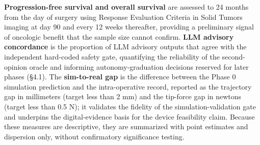 \textbf{Progression-free survival and overall survival} are assessed to 24 months
from the day of surgery using Response Evaluation Criteria in Solid Tumors
imaging at day 90 and every 12 weeks thereafter, providing a preliminary signal of
oncologic benefit that the sample size cannot confirm. \textbf{LLM advisory
concordance} is the proportion of LLM advisory outputs that agree with the
independent hard-coded safety gate, quantifying the reliability of the
second-opinion oracle and informing autonomy-graduation decisions reserved for
later phases (\S4.1). The \textbf{sim-to-real gap} is the difference between the
Phase 0 simulation prediction and the intra-operative record, reported as the
trajectory gap in millimeters (target less than 2 mm) and the tip-force gap in
newtons (target less than 0.5 N); it validates the fidelity of the
simulation-validation gate and underpins the digital-evidence basis for the
device feasibility claim. Because these measures are descriptive, they are
summarized with point estimates and dispersion only, without confirmatory
significance testing.
